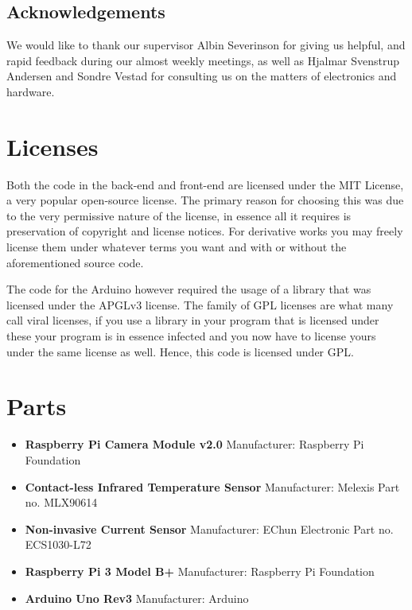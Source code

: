 \documentclass[12pt,a4paper,oneside,article]{memoir}
\numberwithin{equation}{chapter}
\begin{document}
\section{Acknowledgements}\label{sec:acknowledgements}
We would like to thank our supervisor Albin Severinson for giving us helpful, 
and rapid feedback during our almost weekly meetings, as well as Hjalmar 
Svenstrup Andersen and Sondre Vestad for consulting us on the matters of 
electronics and hardware.

\clearpage
\appendix
\chapter{Licenses}\label{sec:licenses}
Both the code in the back-end and front-end are licensed under the MIT License,
a very popular open-source license. The primary reason for choosing this was due
to the very permissive nature of the license, in essence all it requires is
preservation of copyright and license notices. For derivative works you may
freely license them under whatever terms you want and with or without the
aforementioned source code.

The code for the Arduino however required the usage of a library that was
licensed under the APGLv3 license. The family of GPL licenses are what many call
viral licenses, if you use a library in your program that is licensed under
these your program is in essence infected and you now have to license yours
under the same license as well. Hence, this code is licensed under GPL.

\chapter{Parts}\label{sec:parts}
\begin{itemize}
\item \textbf{Raspberry Pi Camera Module v2.0} \newline
Manufacturer: Raspberry Pi Foundation

\item \textbf{Contact-less Infrared Temperature Sensor} \newline
Manufacturer: Melexis \newline
Part no. MLX90614

\item \textbf{Non-invasive Current Sensor} \newline
Manufacturer: EChun Electronic \newline
Part no. ECS1030-L72

\item \textbf{Raspberry Pi 3 Model B+} \newline
Manufacturer: Raspberry Pi Foundation 

\item \textbf{Arduino Uno Rev3} \newline
Manufacturer: Arduino

\end{itemize}
\end{document}
